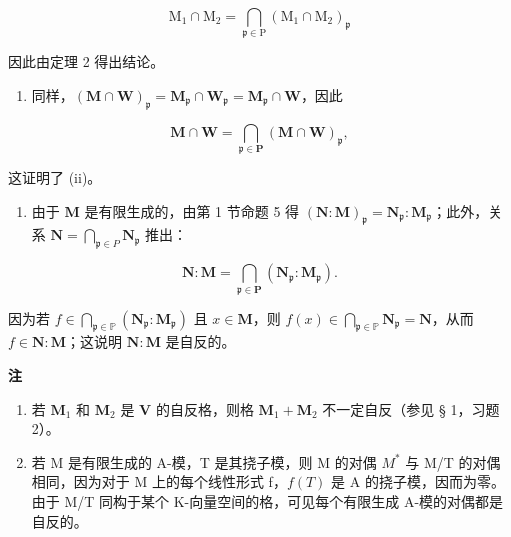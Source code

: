 \[
\mathrm{M} _ {1} \cap \mathrm{M} _ {2} = \bigcap_ {\mathfrak {p} \in \mathrm{P}} (\mathrm{M} _ {1} \cap \mathrm{M} _ {2}) _ {\mathfrak {p}}
\]

因此由定理 2 得出结论。

\begin{enumerate}
\def\labelenumi{(\roman{enumi})}
\setcounter{enumi}{1}
\tightlist
\item
  同样，\((\mathbf{M} \cap \mathbf{W})_{\mathfrak{p}} = \mathbf{M}_{\mathfrak{p}} \cap \mathbf{W}_{\mathfrak{p}} = \mathbf{M}_{\mathfrak{p}} \cap \mathbf{W}\)，因此
\end{enumerate}

\[
\mathbf {M} \cap \mathbf {W} = \bigcap_ {\mathfrak {p} \in \mathbf {P}} (\mathbf {M} \cap \mathbf {W}) _ {\mathfrak {p}},
\]

这证明了 (ii)。

\begin{enumerate}
\def\labelenumi{(\roman{enumi})}
\setcounter{enumi}{2}
\tightlist
\item
  由于 \(\mathbf{M}\) 是有限生成的，由第 1 节命题 5 得 \((\mathbf{N}:\mathbf{M})_{\mathfrak{p}} = \mathbf{N}_{\mathfrak{p}}:\mathbf{M}_{\mathfrak{p}}\)；此外，关系 \(\mathbf{N} = \bigcap_{\mathfrak{p}\in P}\mathbf{N}_{\mathfrak{p}}\) 推出：
\end{enumerate}

\[
\mathbf {N}: \mathbf {M} = \bigcap_ {\mathfrak {p} \in \mathbf {P}} \left(\mathbf {N} _ {\mathfrak {p}}: \mathbf {M} _ {\mathfrak {p}}\right).
\]

因为若 \(f \in \bigcap_{\mathfrak{p} \in \mathbb{P}} (\mathbf{N}_{\mathfrak{p}}: \mathbf{M}_{\mathfrak{p}})\) 且 \(x \in \mathbf{M}\)，则 \(f(x) \in \bigcap_{\mathfrak{p} \in \mathbb{P}} \mathbf{N}_{\mathfrak{p}} = \mathbf{N}\)，从而 \(f \in \mathbf{N}: \mathbf{M}\)；这说明 \(\mathbf{N}: \mathbf{M}\) 是自反的。

\textbf{注}\par

\begin{enumerate}
\def\labelenumi{(\arabic{enumi})}
\setcounter{enumi}{1}
\item
  若 \(\mathbf{M}_1\) 和 \(\mathbf{M}_2\) 是 \(\mathbf{V}\) 的自反格，则格 \(\mathbf{M}_1 + \mathbf{M}_2\) 不一定自反（参见 § 1，习题 2）。
\item
  若 M 是有限生成的 A-模，T 是其挠子模，则 M 的对偶 \(M^{*}\) 与 M/T 的对偶相同，因为对于 M 上的每个线性形式 f，\(f(T)\) 是 A 的挠子模，因而为零。由于 M/T 同构于某个 K-向量空间的格，可见每个有限生成 A-模的对偶都是自反的。
\end{enumerate}

